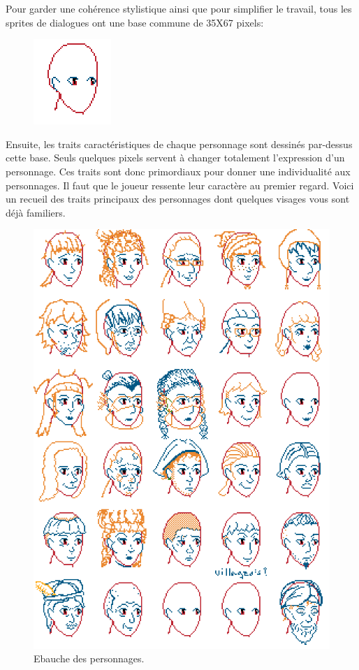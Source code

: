 \documentclass[11pt]{article}
\begin{document}
Pour garder une cohérence stylistique ainsi que pour simplifier le travail, tous les sprites de dialogues ont une base commune de 35X67 pixels: 
\begin{figure}[H]
\includegraphics{base}
\centering
\end{figure}
Ensuite, les traits caractéristiques de chaque personnage sont dessinés par-dessus cette base. Seuls quelques pixels servent à changer totalement l'expression d'un personnage. Ces traits sont donc primordiaux pour donner une individualité aux personnages. Il faut que le joueur ressente leur caractère au premier regard. Voici un recueil des traits principaux des personnages dont quelques visages vous sont déjà familiers.\\
\begin{figure}[H]
\includegraphics[scale=0.7]{faces_Candide}
\centering
\caption{Ebauche des personnages.}
\end{figure}
\end{document}

